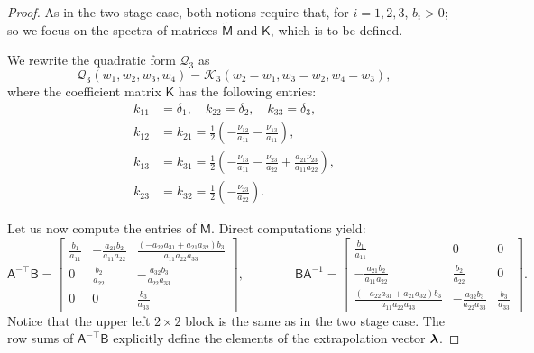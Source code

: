 \documentclass[10pt,a4paper]{amsart}
\newcommand{\AJS}[1]{#1}
\newcommand{\bflambda}{\mbox{\boldmath$\lambda$}}
\newcommand{\mclK}{\mathcal{K}}
\newcommand{\mclQ}{\mathcal{Q}}
\newcommand{\msfA}{\mathsf{A}}
\newcommand{\msfB}{\mathsf{B}}
\newcommand{\msfK}{\mathsf{K}}
\newcommand{\msfM}{\mathsf{M}}
\begin{document}
\begin{proof}
  \AJS{As in the two-stage case, both notions require that, for $i=1,2,3$, $b_i>0$; so we focus on the spectra of matrices $\tilde{\msfM}$ and $\msfK$, which is to be defined}.
  
  We rewrite the quadratic form $\mclQ_3$ as
  \[
    \mclQ_3(w_1,w_2,w_3,w_4) = \mclK_3(w_2-w_1,w_3 - w_2, w_4 - w_3),
  \]
  where the coefficient matrix $\msfK$ has the following entries:
  \begin{align*}
    k_{11} &= \delta_1, \quad k_{22} = \delta_2, \quad k_{33} = \delta_3, \\
    k_{12} &= k_{21} = \frac{1}{2} \left( -\frac{\nu_{12}}{a_{11}} - \frac{\nu_{13}}{a_{11}} \right), \\
    k_{13} &= k_{31} = \frac{1}{2} \left( -\frac{\nu_{13}}{a_{11}} - \frac{\nu_{23}}{a_{22}} + \frac{a_{21}\nu_{23}}{a_{11}a_{22}} \right), \\
    k_{23} &= k_{32} = \frac{1}{2} \left( -\frac{\nu_{23}}{a_{22}} \right).
  \end{align*}

  Let us now compute the entries of $\tilde{\msfM}$. Direct computations yield:
  \begin{equation*}
    \msfA^{-\top}\msfB =
    \begin{bmatrix}
      \frac{b_1}{a_{11}} & -\frac{a_{21}b_2}{a_{11}a_{22}} & \frac{(-a_{22}a_{31}+a_{21}a_{32})b_3}{a_{11}a_{22}a_{33}} \\
      0 & \frac{b_2}{a_{22}} & -\frac{a_{32}b_3}{a_{22}a_{33}} \\
      0 & 0 & \frac{b_3}{a_{33}}
    \end{bmatrix},
    \qquad\qquad
    \msfB\msfA^{-1} =
    \begin{bmatrix}
      \frac{b_1}{a_{11}} & 0 & 0 \\
      -\frac{a_{21}b_2}{a_{11}a_{22}} & \frac{b_2}{a_{22}} & 0 \\
      \frac{(-a_{22}a_{31}+a_{21}a_{32})b_3}{a_{11}a_{22}a_{33}} & -\frac{a_{32}b_3}{a_{22}a_{33}} & \frac{b_3}{a_{33}}
    \end{bmatrix}.
  \end{equation*}
  Notice that the upper left $2 \times 2$ block is the same as in the two stage case. The row sums of $\msfA^{-\top}\msfB$ explicitly define the elements of the extrapolation vector $\bflambda$.


\end{proof}
\end{document}
